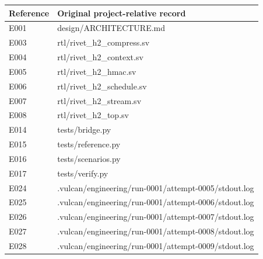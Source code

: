 \documentclass[11pt,a4paper]{article}
\begin{document}
{\small\renewcommand{\arraystretch}{1.18}\begin{longtable}{@{}L{0.12\textwidth}|L{0.82\textwidth}@{}}\toprule

\textbf{Reference} & \textbf{Original project-relative record}\\\midrule\endhead

E001 & design/\allowbreak{}ARCHITECTURE.md\\[2pt]\hline

E003 & rtl/\allowbreak{}rivet\_\allowbreak{}h2\_\allowbreak{}compress.sv\\[2pt]\hline

E004 & rtl/\allowbreak{}rivet\_\allowbreak{}h2\_\allowbreak{}context.sv\\[2pt]\hline

E005 & rtl/\allowbreak{}rivet\_\allowbreak{}h2\_\allowbreak{}hmac.sv\\[2pt]\hline

E006 & rtl/\allowbreak{}rivet\_\allowbreak{}h2\_\allowbreak{}schedule.sv\\[2pt]\hline

E007 & rtl/\allowbreak{}rivet\_\allowbreak{}h2\_\allowbreak{}stream.sv\\[2pt]\hline

E008 & rtl/\allowbreak{}rivet\_\allowbreak{}h2\_\allowbreak{}top.sv\\[2pt]\hline

E014 & tests/\allowbreak{}bridge.py\\[2pt]\hline

E015 & tests/\allowbreak{}reference.py\\[2pt]\hline

E016 & tests/\allowbreak{}scenarios.py\\[2pt]\hline

E017 & tests/\allowbreak{}verify.py\\[2pt]\hline

E024 & .vulcan/\allowbreak{}engineering/\allowbreak{}run-0001/\allowbreak{}attempt-0005/\allowbreak{}stdout.log\\[2pt]\hline

E025 & .vulcan/\allowbreak{}engineering/\allowbreak{}run-0001/\allowbreak{}attempt-0006/\allowbreak{}stdout.log\\[2pt]\hline

E026 & .vulcan/\allowbreak{}engineering/\allowbreak{}run-0001/\allowbreak{}attempt-0007/\allowbreak{}stdout.log\\[2pt]\hline

E027 & .vulcan/\allowbreak{}engineering/\allowbreak{}run-0001/\allowbreak{}attempt-0008/\allowbreak{}stdout.log\\[2pt]\hline

E028 & .vulcan/\allowbreak{}engineering/\allowbreak{}run-0001/\allowbreak{}attempt-0009/\allowbreak{}stdout.log\\[2pt]\hline

\bottomrule\end{longtable}}
\end{document}
